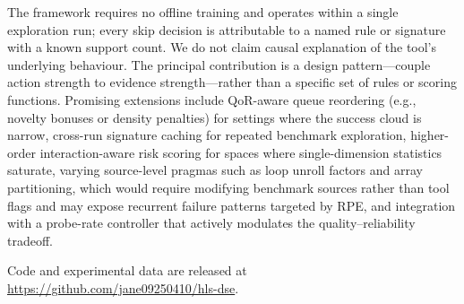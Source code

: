 \documentclass[journal]{IEEEtran}
\begin{document}
The framework requires no offline training and operates within a single exploration run; every skip decision is attributable to a named rule or signature with a known support count. We do not claim causal explanation of the tool's underlying behaviour. The principal contribution is a design pattern---couple action strength to evidence strength---rather than a specific set of rules or scoring functions. Promising extensions include QoR-aware queue reordering (e.g., novelty bonuses or density penalties) for settings where the success cloud is narrow, cross-run signature caching for repeated benchmark exploration, higher-order interaction-aware risk scoring for spaces where single-dimension statistics saturate, varying source-level pragmas such as loop unroll factors and array partitioning, which would require modifying benchmark sources rather than tool flags and may expose recurrent failure patterns targeted by RPE, and integration with a probe-rate controller that actively modulates the quality--reliability tradeoff.

Code and experimental data are released at \url{https://github.com/jane09250410/hls-dse}.


{\small
\enlargethispage{4\baselineskip}

}
\end{document}
